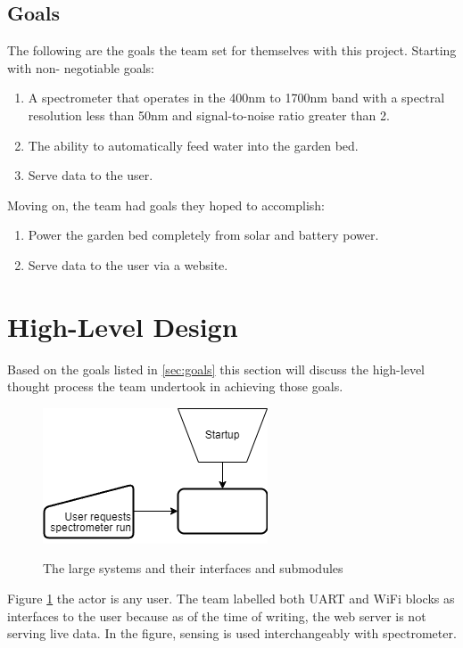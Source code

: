 \documentclass[journal]{IEEEtran}
\begin{document}
\subsection{Goals} \label{sec:goals}
The following are the goals the team set for themselves with this project. Starting with non-
negotiable goals:
\begin{enumerate}
   \item A spectrometer that operates in the 400nm to 1700nm band with a spectral resolution less
         than 50nm and signal-to-noise ratio greater than 2.
   \item The ability to automatically feed water into the garden bed.
   \item Serve data to the user.
\end{enumerate}
Moving on, the team had goals they hoped to accomplish:
\begin{enumerate}
   \item Power the garden bed completely from solar and battery power.
   \item Serve data to the user via a website.
\end{enumerate}
\section{High-Level Design}
Based on the goals listed in \autoref{sec:goals} this section will discuss the high-level thought
process the team undertook in achieving those goals.
\begin{figure}[H]
    \centering
    \includegraphics[width=\linewidth]{images/Flowchart.png}
    \label{fig:flowchart}
    \caption{The large systems and their interfaces and submodules}
\end{figure}
Figure \ref{fig:flowchart} the actor is any user. The team labelled both UART and WiFi blocks as interfaces to the user
because as of the time of writing, the web server is not serving live data. In the figure, sensing is used interchangeably with spectrometer.
\end{document}
